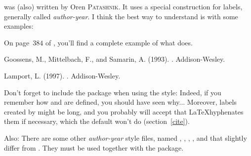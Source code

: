 


 was (also) written by Oren \textsc{Patashnik}. It uses a
special construction for labels, generally called \emph{author-year}.
I think the best way to understand is with some examples:

\begin{myex}
\makeatletter
\def\@cite#1#2{(#1\if@tempswa , #2\fi)}
\def\@biblabel#1{}
\makeatother

On page~$384$ of \cite{latex:lcici}, you'll find a complete example of
what  does.

\begin{thebibliography}{}
Goossens, M., Mittelbach, F., and Samarin, A. (1993).
.
\newblock Addison-Wesley.

Lamport, L. (1997).
.
\newblock Addison-Wesley.
\end{thebibliography}
\end{myex}

Don't forget to include the  package when using
the  style: Indeed, if you remember how 
and  are defined, you should have seen why... 
Moreover, labels created
by  might be long, and you probably will accept that
\LaTeX hyphenates them if necessary, which the default
 won't do (\cf section~\ref{cite}).


Also: There are some other \emph{author-year} style files, named 
, , ,
, and that slightly differ from .
They must be used together with the 
 package.

